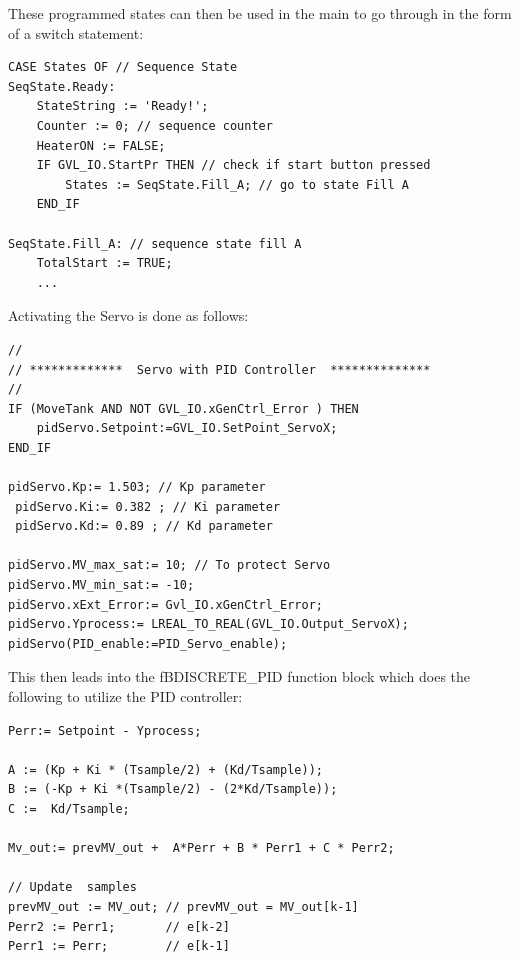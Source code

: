 \documentclass[11pt]{essayStyle} %
\begin{document}
These programmed states can then be used in the main to go through in the form of a switch statement:

\begin{lstlisting}
CASE States OF // Sequence State
SeqState.Ready: 
	StateString := 'Ready!';
	Counter := 0; // sequence counter
	HeaterON := FALSE;
	IF GVL_IO.StartPr THEN // check if start button pressed
		States := SeqState.Fill_A; // go to state Fill A
	END_IF
	
SeqState.Fill_A: // sequence state fill A
	TotalStart := TRUE;
	...
\end{lstlisting}

Activating the Servo is done as follows:

\begin{lstlisting}
//
// *************  Servo with PID Controller  **************
//
IF (MoveTank AND NOT GVL_IO.xGenCtrl_Error ) THEN
	pidServo.Setpoint:=GVL_IO.SetPoint_ServoX;
END_IF

pidServo.Kp:= 1.503; // Kp parameter
 pidServo.Ki:= 0.382 ; // Ki parameter
 pidServo.Kd:= 0.89 ; // Kd parameter 

pidServo.MV_max_sat:= 10; // To protect Servo
pidServo.MV_min_sat:= -10; 
pidServo.xExt_Error:= Gvl_IO.xGenCtrl_Error;
pidServo.Yprocess:= LREAL_TO_REAL(GVL_IO.Output_ServoX);
pidServo(PID_enable:=PID_Servo_enable); 
\end{lstlisting}

This then leads into the fBDISCRETE\_PID function block which does the following to utilize the PID controller:

\begin{lstlisting}
Perr:= Setpoint - Yprocess;

A := (Kp + Ki * (Tsample/2) + (Kd/Tsample));
B := (-Kp + Ki *(Tsample/2) - (2*Kd/Tsample));
C :=  Kd/Tsample;

Mv_out:= prevMV_out +  A*Perr + B * Perr1 + C * Perr2;

// Update  samples 
prevMV_out := MV_out; // prevMV_out = MV_out[k-1] 
Perr2 := Perr1;       // e[k-2]
Perr1 := Perr;        // e[k-1]

\end{lstlisting}






\end{document}
